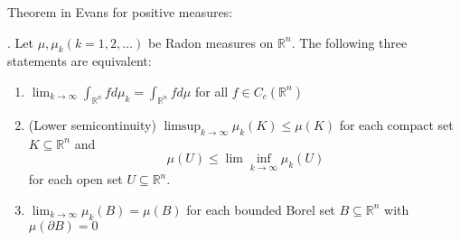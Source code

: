\begin{question} Theorem in Evans for positive measures:
\begin{theorem}. Let $\mu, \mu_k(k=1,2, \ldots)$ be Radon measures on $\mathbb{R}^n$. The following three statements are equivalent:
\begin{enumerate}
    \item $\lim _{k \rightarrow \infty} \int_{\mathbb{R}^n} f d \mu_k=\int_{\mathbb{R}^n} f d \mu$ for all $f \in C_c\left(\mathbb{R}^n\right)$
    \item(Lower semicontinuity) $\limsup _{k \rightarrow \infty} \mu_k(K) \leq \mu(K)$ for each compact set $K \subseteq \mathbb{R}^n$ and $$\mu(U) \leq \lim \inf _{k \rightarrow \infty} \mu_k(U)$$ for each open set $U \subseteq \mathbb{R}^n$.
    \item $\lim _{k \rightarrow \infty} \mu_k(B)=\mu(B)$ for each bounded Borel set $B \subseteq \mathbb{R}^n$ with $\mu(\partial B)=0$
\end{enumerate}
\end{theorem}
\end{question}

